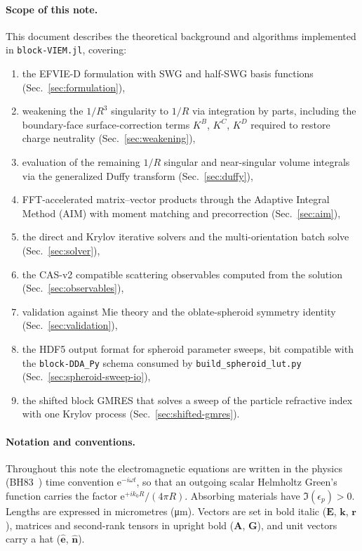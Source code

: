 \documentclass[11pt,a4paper]{article}
\begin{document}
\paragraph{Scope of this note.}
This document describes the theoretical background and algorithms
implemented in \texttt{block-VIEM.jl}, covering:
\begin{enumerate}
  \item the EFVIE-D formulation with SWG and half-SWG basis functions
        (Sec.~\ref{sec:formulation}),
  \item weakening the $1/R^3$ singularity to $1/R$ via integration by
        parts, including the boundary-face surface-correction terms
        $K^{B}$, $K^{C}$, $K^{D}$ required to restore charge neutrality
        (Sec.~\ref{sec:weakening}),
  \item evaluation of the remaining $1/R$ singular and near-singular
        volume integrals via the generalized Duffy transform
        (Sec.~\ref{sec:duffy}),
  \item FFT-accelerated matrix--vector products through the Adaptive
        Integral Method (AIM) with moment matching and precorrection
        (Sec.~\ref{sec:aim}),
  \item the direct and Krylov iterative solvers and the
        multi-orientation batch solve
        (Sec.~\ref{sec:solver}),
  \item the CAS-v2 compatible scattering observables computed from the
        solution (Sec.~\ref{sec:observables}),
  \item validation against Mie theory and the oblate-spheroid symmetry
        identity (Sec.~\ref{sec:validation}),
  \item the HDF5 output format for spheroid parameter sweeps, bit
        compatible with the \texttt{block-DDA\_Py} schema consumed by
        \texttt{build\_spheroid\_lut.py}
        (Sec.~\ref{sec:spheroid-sweep-io}),
  \item the shifted block GMRES that solves a sweep of the particle
        refractive index with one Krylov process
        (Sec.~\ref{sec:shifted-gmres}).
\end{enumerate}

\paragraph{Notation and conventions.}
Throughout this note the electromagnetic equations are written in the
physics (BH83~\cite{Bohren1983}) time convention $\mathrm{e}^{-i\omega t}$,
so that an outgoing scalar Helmholtz Green's function carries the factor
$\mathrm{e}^{+ik_0 R}/(4\pi R)$. Absorbing materials have
$\Im(\epsilon_p) > 0$. Lengths are expressed in micrometres
(\si{\micro\metre}). Vectors are set in bold italic
($\bm{E}$, $\bm{k}$, $\bm{r}$), matrices and second-rank tensors in
upright bold ($\mathbf{A}$, $\mathbf{G}$), and unit vectors carry a hat
($\hat{\bm{e}}$, $\hat{\bm{n}}$).
\end{document}
